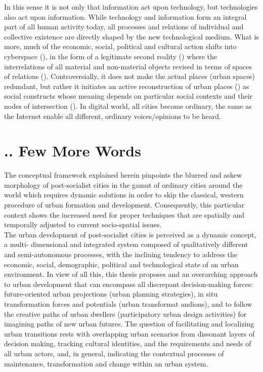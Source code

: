 \documentclass[11pt]{report}
\begin{document}
{In this sense it is not only that information act upon technology, but technologies also act upon information.
While technology and information form an integral part of all human activity today, all processes and relations of individual and collective existence are directly shaped by the new technological medium.
What is more, much of the economic, social, political and cultural action shifts into cyberspace (\href{Mitchell}{\citealt{mitchell_city_1996}}), in the form of a legitimate second reality (\href{Baudrillard}{\citealt{baudrillard_l_1983}}) where the interrelations of  all material and non-material objects revised in terms of spaces of relations (\href{Graham}{\citealt{graham_relational_1999}}).
Controversially, it does not make the actual places (urban spaces) redundant, but rather it initiates an active reconstruction of urban places (\href{ref}{\citealt{graham_splintering_2001}}) as social constructs whose meaning depends on particular social contexts and their nodes of intersection (\href{ref}{\citealt{healey_treatment_2004}}).
In digital world, all cities become ordinary, the same as the Internet enable all different, ordinary voices/opinions to be heard.

\section{.. Few More Words}

The conceptual framework explained herein pinpoints the blurred and askew morphology of post-socialist cities in the gamut of ordinary cities around the world which requires dynamic solutions in order to skip the classical, western procedure of urban formation and development. Consequently, this particular context shows the increased need for proper techniques that are spatially and temporally adjusted to current socio-spatial issues. 
\\

The urban development of post-socialist cities is perceived as a dynamic concept, a multi- dimensional and integrated system composed of qualitatively different and semi-autonomous processes, with the inclining tendency to address the economic, social, demographic, political and technological state of an urban environment.  In view of all this, this thesis proposes and an overarching approach to urban development that can encompass all discrepant decision-making forces: future-oriented urban projections (urban planning strategies), in situ transformation forces and potentials (urban transformat andions), and to follow the creative paths of urban dwellers (participatory urban design activities) for imagining paths of new urban futures.
The question of facilitating and localizing urban transitions rests with overlapping urban scenarios from dissonant layers of decision making, tracking cultural identities, and the requirements and needs of all urban actors, and, in general, indicating the contextual processes of maintenance, transformation and change within an urban system.

}
\end{document}
